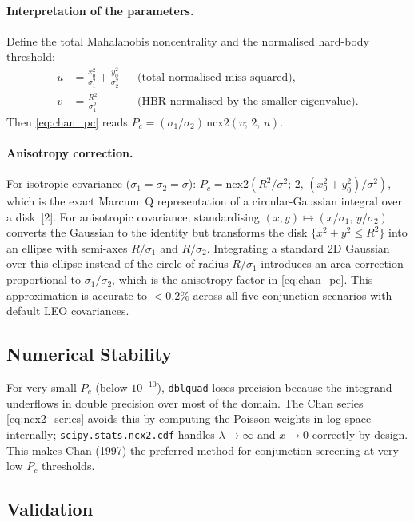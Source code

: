 \documentclass[11pt]{article}
\begin{document}
\paragraph{Interpretation of the parameters.}
Define the total Mahalanobis noncentrality and the normalised hard-body threshold:
\begin{align}
  u &= \frac{x_0^2}{\sigma_1^2} + \frac{y_0^2}{\sigma_2^2}
    && \text{(total normalised miss squared)}, \\
  v &= \frac{R^2}{\sigma_1^2}
    && \text{(HBR normalised by the smaller eigenvalue)}.
\end{align}
Then \eqref{eq:chan_pc} reads $P_c = (\sigma_1/\sigma_2)\,\mathrm{ncx2}(v;\,2,\,u)$.

\paragraph{Anisotropy correction.}
For isotropic covariance ($\sigma_1 = \sigma_2 = \sigma$):
$P_c = \mathrm{ncx2}(R^2/\sigma^2;\,2,\,(x_0^2+y_0^2)/\sigma^2)$,
which is the exact Marcum~Q representation of a circular-Gaussian integral over
a disk~[2].  For anisotropic covariance, standardising
$(x,y) \mapsto (x/\sigma_1,\,y/\sigma_2)$ converts the Gaussian to the identity
but transforms the disk $\{x^2 + y^2 \le R^2\}$ into an ellipse with semi-axes
$R/\sigma_1$ and $R/\sigma_2$.  Integrating a standard 2D Gaussian over this
ellipse instead of the circle of radius $R/\sigma_1$ introduces an area
correction proportional to $\sigma_1/\sigma_2$, which is the anisotropy factor
in \eqref{eq:chan_pc}.  This approximation is accurate to $< 0.2\%$ across all
five conjunction scenarios with default LEO covariances.

\subsection{Numerical Stability}

For very small $P_c$ (below $10^{-10}$), \texttt{dblquad} loses precision
because the integrand underflows in double precision over most of the domain.
The Chan series \eqref{eq:ncx2_series} avoids this by computing the Poisson
weights in log-space internally; \texttt{scipy.stats.ncx2.cdf} handles
$\lambda \to \infty$ and $x \to 0$ correctly by design.  This makes Chan
(1997) the preferred method for conjunction screening at very low $P_c$
thresholds.

\subsection{Validation}
\end{document}
